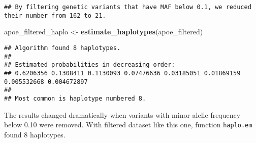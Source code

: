 \documentclass[
]{article}
\newenvironment{Shaded}{\begin{snugshade}}{\end{snugshade}}
\newcommand{\CharTok}[1]{\textcolor[rgb]{0.31,0.60,0.02}{#1}}
\newcommand{\ControlFlowTok}[1]{\textcolor[rgb]{0.13,0.29,0.53}{\textbf{#1}}}
\newcommand{\DataTypeTok}[1]{\textcolor[rgb]{0.13,0.29,0.53}{#1}}
\newcommand{\DecValTok}[1]{\textcolor[rgb]{0.00,0.00,0.81}{#1}}
\newcommand{\FloatTok}[1]{\textcolor[rgb]{0.00,0.00,0.81}{#1}}
\newcommand{\KeywordTok}[1]{\textcolor[rgb]{0.13,0.29,0.53}{\textbf{#1}}}
\newcommand{\NormalTok}[1]{#1}
\newcommand{\OperatorTok}[1]{\textcolor[rgb]{0.81,0.36,0.00}{\textbf{#1}}}
\newcommand{\OtherTok}[1]{\textcolor[rgb]{0.56,0.35,0.01}{#1}}
\newcommand{\StringTok}[1]{\textcolor[rgb]{0.31,0.60,0.02}{#1}}
\begin{document}
\begin{Shaded}
\end{Shaded}

\begin{verbatim}
## By filtering genetic variants that have MAF below 0.1, we reduced their number from 162 to 21.
\end{verbatim}

\begin{Shaded}
\begin{Highlighting}[]
\NormalTok{apoe_filtered_haplo <-}\StringTok{ }\KeywordTok{estimate_haplotypes}\NormalTok{(apoe_filtered)}
\end{Highlighting}
\end{Shaded}

\begin{verbatim}
## Algorithm found 8 haplotypes.
## 
## Estimated probabilities in decreasing order:
## 0.6206356 0.1308411 0.1130093 0.07476636 0.03185051 0.01869159 0.005532668 0.004672897
## 
## Most common is haplotype numbered 8.
\end{verbatim}

The results changed dramatically when variants with minor alelle
frequency below 0.10 were removed. With filtered dataset like this one,
function \texttt{haplo.em} found 8 haplotypes.
\end{document}
